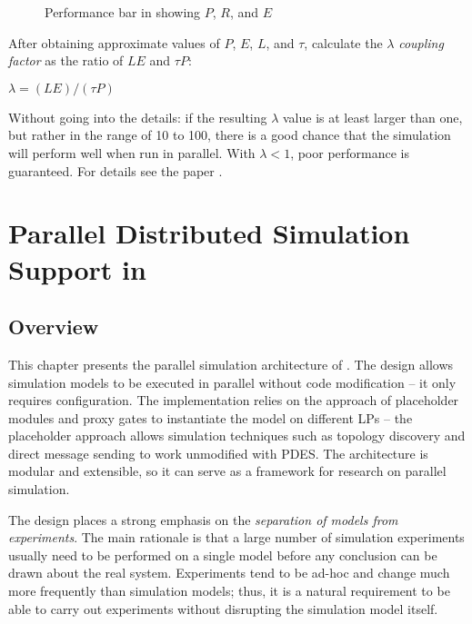 \begin{figure}[htbp]
  \begin{center}
    \caption{Performance bar in {\opp} showing $P$, $R$, and $E$}
    \label{fig:perfbar-screenshot}
  \end{center}
\end{figure}

After obtaining approximate values of $P$, $E$, $L$, and $\tau$,
calculate the $\lambda$ \textit{coupling factor} as the ratio of $LE$ and $\tau P$:

$\lambda = (LE) / (\tau P)$

Without going into the details: if the resulting $\lambda$ value is at
least larger than one, but rather in the range of 10 to 100, there is
a good chance that the simulation will perform well when run in
parallel. With $\lambda < 1$, poor performance is guaranteed.
For details see the paper \cite{ParsimCrit03}.


\section{Parallel Distributed Simulation Support in {\opp}}
\label{sec:parallel-exec:pdes-support-in-omnetpp}

\subsection{Overview}
\label{sec:parallel-exec:overview}

This chapter presents the parallel simulation architecture
of {\opp}. The design allows simulation models to be executed
in parallel without code modification -- it only requires configuration.
The implementation relies on the approach of placeholder modules
and proxy gates to instantiate the model on different LPs --
the placeholder approach allows simulation techniques such as
topology discovery and direct message sending to work unmodified with
PDES. The architecture is modular and extensible, so it can
serve as a framework for research on parallel simulation.

The {\opp} design places a strong emphasis on the
\textit{separation of models from experiments}. The main rationale
is that a large number of simulation experiments usually need to be performed
on a single model before any conclusion can be drawn about the real system.
Experiments tend to be ad-hoc and change much more frequently than simulation
models; thus, it is a natural requirement to be able to
carry out experiments without disrupting the simulation model itself.

